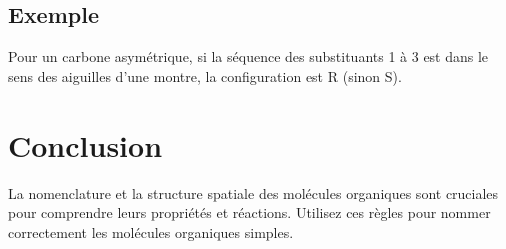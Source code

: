 \documentclass[12pt]{article}
\begin{document}
\subsection{Exemple}
Pour un carbone asymétrique, si la séquence des substituants 1 à 3 est dans le sens des aiguilles d'une montre, la configuration est R (sinon S).

\section{Conclusion}
La nomenclature et la structure spatiale des molécules organiques sont cruciales pour comprendre leurs propriétés et réactions. Utilisez ces règles pour nommer correctement les molécules organiques simples.
\end{document}
